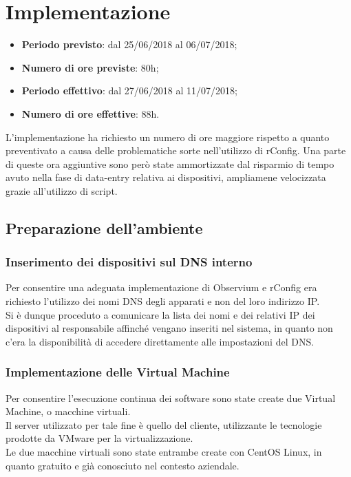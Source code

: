 \documentclass[Realizzazione.tex]{subfiles}
\begin{document}
\section{Implementazione}

\begin{itemize}
	\item \textbf{Periodo previsto}: dal 25/06/2018 al 06/07/2018;
	\item \textbf{Numero di ore previste}: 80h;
	\item \textbf{Periodo effettivo}: dal 27/06/2018 al 11/07/2018;
	\item \textbf{Numero di ore effettive}: 88h.
\end{itemize}

L'implementazione ha richiesto un numero di ore maggiore rispetto a quanto preventivato a causa delle problematiche sorte nell'utilizzo di rConfig. Una parte di queste ora aggiuntive sono però state ammortizzate dal risparmio di tempo avuto nella fase di data-entry relativa ai dispositivi, ampliamene velocizzata grazie all'utilizzo di script.

\subsection{Preparazione dell'ambiente}

\subsubsection{Inserimento dei dispositivi sul DNS interno} 
Per consentire una adeguata implementazione di Observium e rConfig era richiesto l'utilizzo dei nomi DNS degli apparati e non del loro indirizzo IP. \\
Si è dunque proceduto a comunicare la lista dei nomi e dei relativi IP dei dispositivi al responsabile affinché vengano inseriti nel sistema, in quanto non c'era la disponibilità di accedere direttamente alle impostazioni del DNS.

\subsubsection{Implementazione delle Virtual Machine}
Per consentire l'esecuzione continua dei software sono state create due Virtual Machine, o macchine virtuali.\\
Il server utilizzato per tale fine è quello del cliente, utilizzante le tecnologie prodotte da VMware per la virtualizzazione. \\
Le due macchine virtuali sono state entrambe create con CentOS Linux, in quanto gratuito e già conosciuto nel contesto aziendale.
\end{document}
